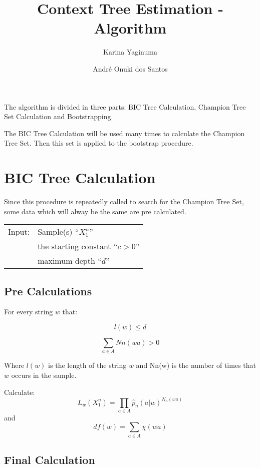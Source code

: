 \documentclass[brazil,11pt]{article}
\author{Karina Yaginuma \and Andr\'e Onuki dos Santos}
\title{Context Tree Estimation - Algorithm}
\begin{document}
\maketitle

The algorithm is divided in three parts: BIC Tree Calculation, Champion Tree Set Calculation and Bootstrapping.

The BIC Tree Calculation will be used many times to calculate the Champion Tree Set. Then this set is applied to the bootstrap procedure.

\section{BIC Tree Calculation}

Since this procedure is repeatedly called to search for the Champion Tree Set, some data which will alway be the same are pre calculated.

\begin{tabular}{rl}
Input: & Sample(s) ``$X^n_1$''\\
& the starting constant ``$c > 0$''\\
&maximum depth ``$d$''
\end{tabular}

\subsection{Pre Calculations}

For every string $w$ that:

\begin{equation}
l(w) \leq d
\end{equation}

\begin{equation}
\sum_{a \in A} Nn(wa) > 0
\end{equation}

Where $l(w)$ is the length of the string $w$ and Nn(w) is the number of times that $w$ occurs in the sample.

Calculate:
\begin{equation*}
L_w(X^n_1) = \prod_{a \in A} \hat{p}_n(a|w)^{N_n(wa)}
\end{equation*}
and
\begin{equation*}
df(w) = \sum_{a \in A} \chi(wa)
\end{equation*}


\subsection{Final Calculation}
\end{document}
